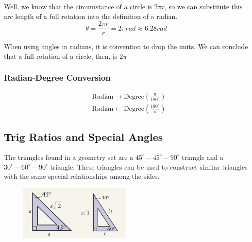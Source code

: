\documentclass{article}
\begin{document}
Well, we know that the circumstance of a circle is $2\pi r$, so we can substitute this arc length of a full rotation into the definition of a radian.
$$\theta = \frac{2\pi r}{r}=2 \pi rad \approx 6.28 rad$$

When using angles in radians, it is convention to drop the units. We can conclude that a full rotation of a circle, then, is $2\pi$


\subsubsection{Radian-Degree Conversion}
\begin{align*}
&\text{Radian} \longrightarrow \text{Degree} \left(\frac{\pi}{180^{\circ}}\right)\\
&\text{Radian} \longleftarrow \text{Degree} \left(\frac{180^{\circ}}{\pi}\right)
\end{align*}

\newpage
\subsection{Trig Ratios and Special Angles}
The triangles found in a geometry set are a $45^{\circ}-45^{\circ}-90^{\circ}$ triangle and a $30^{\circ}-60^{\circ}-90^{\circ}$ triangle. These triangles can be used to construct similar triangles with 
the same special relationships among the sides.

\begin{figure}[ht]
    \centering
    \includegraphics[width=0.5\textwidth]{imgs/special trigs.PNG}
\end{figure}
\end{document}
